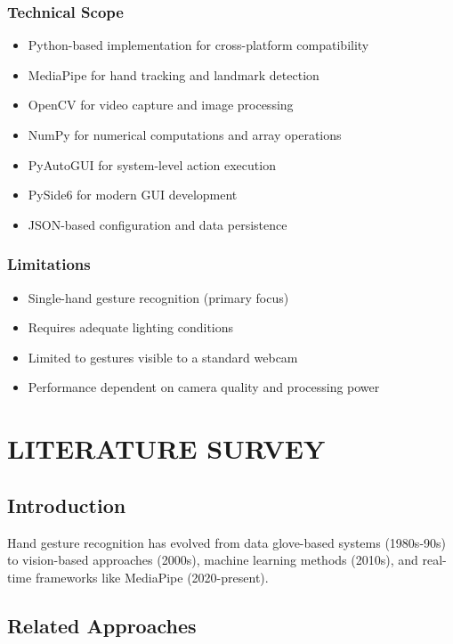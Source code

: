 \documentclass[12pt,a4paper]{report}
\begin{document}
\subsection{Technical Scope}
\begin{itemize}
    \item Python-based implementation for cross-platform compatibility
    \item MediaPipe for hand tracking and landmark detection
    \item OpenCV for video capture and image processing
    \item NumPy for numerical computations and array operations
    \item PyAutoGUI for system-level action execution
    \item PySide6 for modern GUI development
    \item JSON-based configuration and data persistence
\end{itemize}

\subsection{Limitations}
\begin{itemize}
    \item Single-hand gesture recognition (primary focus)
    \item Requires adequate lighting conditions
    \item Limited to gestures visible to a standard webcam
    \item Performance dependent on camera quality and processing power
\end{itemize}

\chapter{LITERATURE SURVEY}

\section{Introduction}

Hand gesture recognition has evolved from data glove-based systems (1980s-90s) to vision-based approaches (2000s), machine learning methods (2010s), and real-time frameworks like MediaPipe (2020-present).

\section{Related Approaches}
\end{document}
